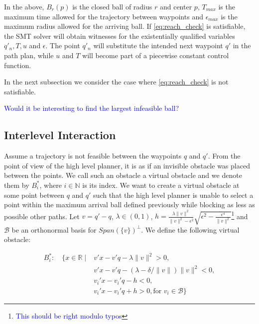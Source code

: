 \documentclass[12pt]{article}
\newcommand\fran[1]{\textcolor{blue}{#1}}
\newcommand\ffran[1]{\textcolor{blue}{\footnote{\fran{#1}}}}
\begin{document}
In the above, $B_r(p)$ is the closed ball of radius $r$ and center $p$, $T_{max}$ is the maximum time allowed for the trajectory between waypoints and $\epsilon_{max}$ is the maximum radius allowed for the arriving ball. If \ref{eq:reach_check} is satisfiable, the SMT solver will obtain witnesses for the existentially qualified variables $q'_n, T, u$ and $\epsilon$. The point $q'_n$ will substitute the intended next waypoint $q'$ in the path plan, while $u$ and $T$ will become part of a piecewise constant control function.

In the next subsection we consider the case where \ref{eq:reach_check} is not satisfiable.

\fran{Would it be interesting to find the largest infeasible ball?}

\subsection{Interlevel Interaction}
\label{sub:interlevel_interaction}

Assume a trajectory is not feasible between the waypoints $q$ and $q'$. From the point of view of the high level planner, it is as if an invisible obstacle was placed between the points. We call such an obstacle a virtual obstacle and we denote them by $B^*_i$, where $i \in \mathbb{N}$ is its index. We want to create a virtual obstacle at some point between $q$ and $q'$ such that the high level planner is unable to select a point within the maximum arrival ball defined previously while blocking as less as possible other paths. Let $v = q' - q$, $\lambda \in (0, 1)$, $h = \frac{\lambda \|v\|^2}{\|v\|^2 - \epsilon^2} \sqrt{\epsilon^2 - \frac{\epsilon^4}{\|v\|^2}}$\ffran{This should be right modulo typos} and $\mathcal{B}$ be an orthonormal basis for $Span(\{v\})^{\bot}$. We define the following virtual obstacle:

\begin{equation}
    \label{eq:virtual_obst}
    \begin{split}
        B^*_i : \quad \{x \in \mathbb{R} \mid &v'x - v'q - \lambda \|v\|^2 > 0, \\
                                              &v'x - v'q - (\lambda - \delta / \|v\|) \|v\|^2 < 0, \\
                                              &v_i'x - v_i'q - h < 0, \\
                                              &v_i'x - v_i'q + h > 0, \text{for } v_i \in \mathcal{B} \}
    \end{split}
\end{equation}
\end{document}
